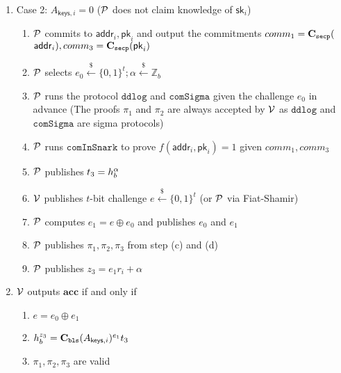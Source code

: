 \begin{mdframed}
\begin{enumerate}
    \item Case 2: $A_{\mathsf{keys},i}=0$ ($\mathcal{P}$ does not claim knowledge of $\mathsf{sk}_i$)
    \begin{enumerate}
        \item $\mathcal{P}$ commits to $\mathsf{addr}_i,\mathsf{pk}_i$ and output the commitments $comm_1=\textbf{C}_\texttt{secp}($ $\mathsf{addr}_i),comm_3=\textbf{C}_\texttt{secp}(\mathsf{pk}_i)$
        \item $\mathcal{P}$ selects $e_0\stackrel{\$}{\leftarrow} \{0,1\}^t;\alpha\stackrel{\$}{\leftarrow}\mathbb{Z}_b$
        \item $\mathcal{P}$ runs the protocol $\texttt{ddlog}$ and $\texttt{comSigma}$ given the challenge $e_0$ in advance (The proofs $\pi_1$ and $\pi_2$ are always accepted by $\mathcal{V}$ as $\texttt{ddlog}$ and $\texttt{comSigma}$ are sigma protocols)
        \item $\mathcal{P}$ runs $\texttt{comInSnark}$ to prove $f(\mathsf{addr}_i,\mathsf{pk}_i)=1$ given $comm_1,comm_3$
        \item $\mathcal{P}$ publishes $t_3=h_b^\alpha$
        \item $\mathcal{V}$ publishes $t$-bit challenge $e\stackrel{\$}{\leftarrow} \{0,1\}^t$ (or $\mathcal{P}$ via Fiat-Shamir)
        \item $\mathcal{P}$ computes $e_1=e\oplus{e_0}$ and publishes $e_0$ and $e_1$    
        \item $\mathcal{P}$ publishes $\pi_1,\pi_2,\pi_3$ from step (c) and (d)
        \item $\mathcal{P}$ publishes $z_3=e_1r_i+\alpha$
    \end{enumerate}
    
    \item $\mathcal{V}$ outputs $\textbf{acc}$ if and only if
    \begin{enumerate}
        \item $e=e_0\oplus{e_1}$
        \item $h_b^{z_3}=\textbf{C}_\texttt{bls}(A_{\mathsf{keys},i})^{e_1}t_3$
        \item $\pi_1,\pi_2,\pi_3$ are valid
    \end{enumerate} 
\end{enumerate}
\end{mdframed}
\label{alg:hashed}
    
